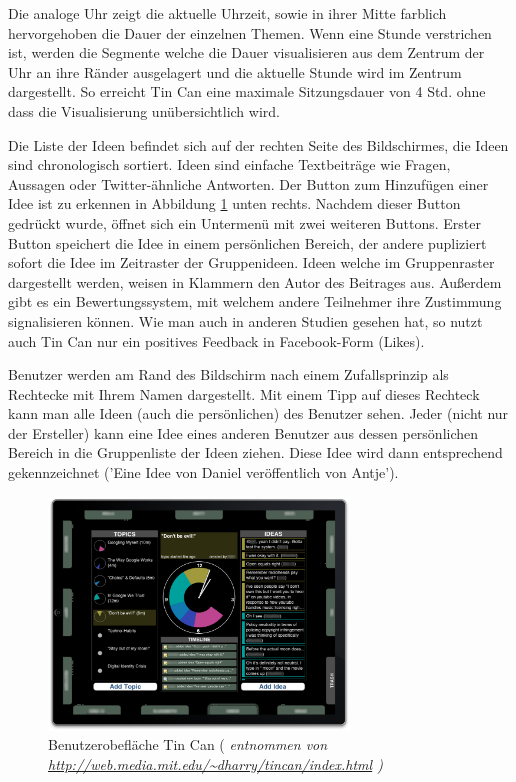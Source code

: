 Die analoge Uhr zeigt die aktuelle Uhrzeit, sowie in ihrer Mitte farblich
hervorgehoben die Dauer der einzelnen Themen.
Wenn eine Stunde verstrichen ist, werden die Segmente welche die Dauer
visualisieren aus dem Zentrum der Uhr an ihre Ränder ausgelagert und die
aktuelle Stunde wird im Zentrum dargestellt. So erreicht Tin Can eine maximale
Sitzungsdauer von 4 Std. ohne dass die Visualisierung unübersichtlich wird.

Die Liste der Ideen befindet sich auf der rechten Seite des Bildschirmes, die
Ideen sind chronologisch sortiert. Ideen sind einfache Textbeiträge wie Fragen,
Aussagen oder Twitter-ähnliche Antworten. Der Button zum Hinzufügen einer Idee
ist zu erkennen in Abbildung \ref{tincan_ui} unten rechts. Nachdem dieser Button
gedrückt wurde, öffnet sich ein Unt\-er\-menü mit zwei weiteren Buttons. Erster
Button speichert die Idee in einem persönlichen Bereich, der andere pupliziert
sofort die Idee im Zeitraster der Gruppenideen.
Ideen welche im Gruppenraster dargestellt werden, weisen in Klammern den Autor
des Beitrages aus. Außerdem gibt es ein Bewertungssystem, mit welchem andere
Teilnehmer ihre Zustimmung signalisieren können. Wie man auch in anderen Studien
\cite{HarGorSch2012}\cite{KimChaHolPent2008}
gesehen hat, so nutzt auch Tin Can nur ein positives Feedback in Facebook-Form
(Likes).

Benutzer werden am Rand des Bildschirm nach einem Zufallsprinzip als Rechtecke
mit Ihrem Namen dargestellt. Mit einem Tipp auf dieses Rechteck kann man alle
Ideen (auch die persönlichen) des Benutzer sehen. Jeder (nicht nur der
Ersteller) kann eine Idee eines anderen Benutzer aus dessen persönlichen
Bereich in die Gruppenliste der Ideen ziehen. Diese Idee wird dann
entsprechend gekennzeichnet ('Eine Idee von Daniel veröffentlich von Antje').

\begin{figure}[htp]
\centering
\includegraphics[width=8cm]{tincan_ui.png}
\caption{Benutzerobefläche Tin Can ( \em {entnommen von \url {http://web.media.mit.edu/~dharry/tincan/index.html}} )}
\label{tincan_ui}
\end{figure}

